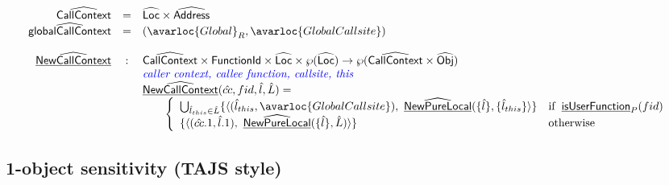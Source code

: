 \[
\begin{array}{rcl}
\abs{CallContext} & = & \aLoc \times \abs{Address} \\
\abs{globalCallContext} & = & (\avarloc{Global}_R, \avarloc{GlobalCallsite}) \\
\\

\ahf{NewCallContext} & : & \abs{CallContext} \times \SF{FunctionId} \times \abs{Loc} \times \powerset{\abs{Loc}} \rightarrow \powerset{\abs{CallContext} \times \abs{Obj}} \\
& & \comment{\inblue caller context, callee function, callsite, this}  \\
& & \ahf{NewCallContext}(\hat{cc}, fid, \hat{l}, \hat{L}) = \\
& & \quad\quad \left\{
       \begin{array}{ll}
         \bigcup_{\hat{l}_{this} \in \hat{L}} 
         \{ \langle (\hat{l}_{this}, \avarloc{GlobalCallsite}), ~ \ahf{NewPureLocal}(\{\hat{l}\}, \{ \hat{l}_{this} \} \rangle \} & \ifc{\chf{isUserFunction}_P(fid)} \\
         \{ \langle (\hat{cc}.1, \hat{l}.1), ~ \ahf{NewPureLocal}(\{\hat{l}\}, \hat{L}) \rangle \} & \owc \\
       \end{array}
     \right.\\
\end{array}
\]


\subsection{1-object sensitivity (TAJS style)}

